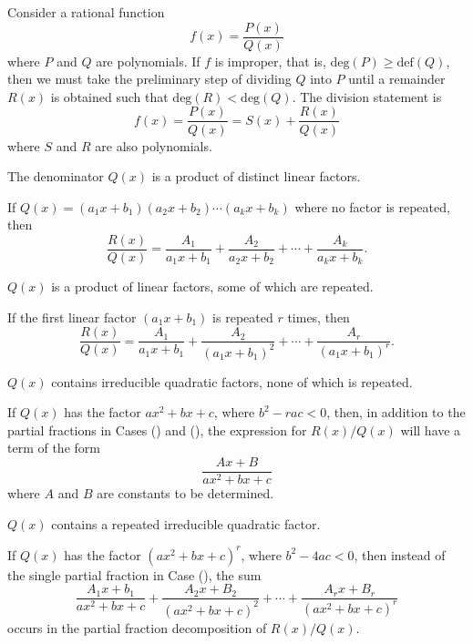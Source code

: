 \documentclass[a4paper,11pt]{article}
\begin{document}
\begin{outline}
    Consider a rational function \[f(x)=\frac{P(x)}{Q(x)}\] where \(P\) and \(Q\) are polynomials. If \(f\) is
    improper, that is, \(\text{deg}(P)\geq\text{def}(Q)\), then we must take the preliminary step of dividing
    \(Q\) into \(P\) until a remainder \(R(x)\) is obtained such that \(\text{deg}(R)<\text{deg}(Q)\). The division
    statement is \[f(x)=\frac{P(x)}{Q(x)}=S(x)+\frac{R(x)}{Q(x)}\] where \(S\) and \(R\) are also polynomials.
    
    \begin{proofcases}
      \item 
        The denominator \(Q(x)\) is a product of distinct linear factors.
        
        If \(Q(x) = (a_1x+b_1)(a_2x+b_2)\cdots(a_kx+b_k)\) where no factor is repeated, then \[ \frac{R(x)}{Q(x)}
        = \frac{A_1}{a_1x+b_1} + \frac{A_2}{a_2x+b_2} + \cdots + \frac{A_k}{a_kx+b_k}\text{.} \]
      \item
        \(Q(x)\) is a product of linear factors, some of which are repeated.
        
        If the first linear factor \((a_1x+b_1)\) is repeated \(r\) times, then \[ \frac{R(x)}{Q(x)} = 
        \frac{A_1}{a_1x+b_1} + \frac{A_2}{(a_1x+b_1)^2} + \cdots + \frac{A_r}{(a_1x+b_1)^r}\text{.} \]
      \item
        \(Q(x)\) contains irreducible quadratic factors, none of which is repeated.
        
        If \(Q(x)\) has the factor \(ax^2+bx+c\), where \(b^2-rac < 0\), then, in addition to the partial fractions
        in Cases () and (), the expression for \(R(x)/Q(x)\) will have a term
        of the form \[\frac{Ax+B}{ax^2+bx+c}\] where \(A\) and \(B\) are constants to be determined.
      \item
        \(Q(x)\) contains a repeated irreducible quadratic factor.
        
        If \(Q(x)\) has the factor \((ax^2+bx+c)^r\), where \(b^2-4ac < 0\), then instead of the single partial
        fraction in Case (), the sum \[\frac{A_1x+b_1}{ax^2+bx+c}+\frac{A_2x+B_2}{(ax^2+bx+c)^2}+
        \cdots+\frac{A_rx+B_r}{(ax^2+bx+c)^r}\] occurs in the partial fraction decomposition of \(R(x)/Q(x)\).
      
      
    \end{proofcases}

\end{outline}
\end{document}

